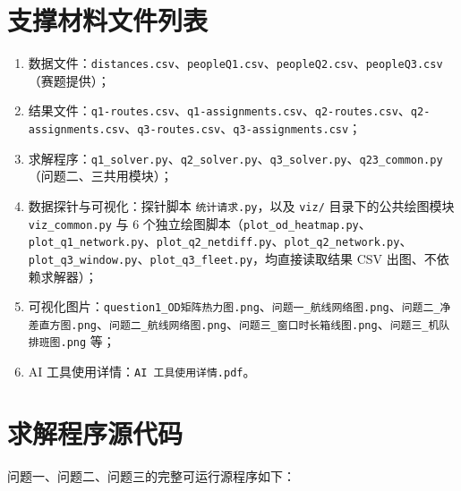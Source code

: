 \documentclass[UTF8,zihao=-4]{ctexart}
\numberwithin{figure}{section}
\numberwithin{table}{section}
\begin{document}
\appendix
\section{支撑材料文件列表}

\begin{enumerate}\sloppy
  \item 数据文件：\texttt{distances.csv}、\texttt{peopleQ1.csv}、\texttt{peopleQ2.csv}、\texttt{peopleQ3.csv}（赛题提供）；
  \item 结果文件：\texttt{q1-routes.csv}、\texttt{q1-assignments.csv}、\texttt{q2-routes.csv}、\texttt{q2-assignments.csv}、\texttt{q3-routes.csv}、\texttt{q3-assignments.csv}；
  \item 求解程序：\texttt{q1\_solver.py}、\texttt{q2\_solver.py}、\texttt{q3\_solver.py}、\texttt{q23\_common.py}（问题二、三共用模块）；
  \item 数据探针与可视化：探针脚本 \texttt{统计请求.py}，以及 \texttt{viz/} 目录下的公共绘图模块 \texttt{viz\_common.py} 与 6 个独立绘图脚本（\texttt{plot\_od\_heatmap.py}、\texttt{plot\_q1\_network.py}、\texttt{plot\_q2\_netdiff.py}、\texttt{plot\_q2\_network.py}、\texttt{plot\_q3\_window.py}、\texttt{plot\_q3\_fleet.py}，均直接读取结果 CSV 出图、不依赖求解器）；
  \item 可视化图片：\texttt{question1\_OD矩阵热力图.png}、\texttt{问题一\_航线网络图.png}、\texttt{问题二\_净差直方图.png}、\texttt{问题二\_航线网络图.png}、\texttt{问题三\_窗口时长箱线图.png}、\texttt{问题三\_机队排班图.png} 等；
  \item AI 工具使用详情：\texttt{AI 工具使用详情.pdf}。
\end{enumerate}

\section{求解程序源代码}

问题一、问题二、问题三的完整可运行源程序如下：








\end{document}
